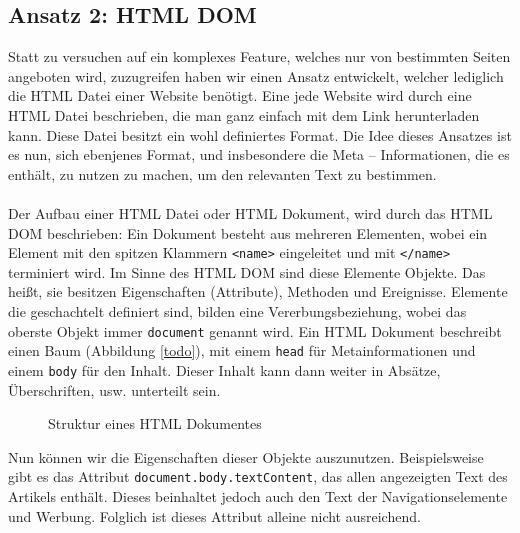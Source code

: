 \subsection[HTML DOM]{Ansatz 2: HTML DOM} %
\label{extractor:ansatz:subsec2}
Statt zu versuchen auf ein komplexes Feature, welches nur von bestimmten Seiten angeboten wird, zuzugreifen haben wir einen Ansatz entwickelt, welcher lediglich die HTML Datei einer Website benötigt. Eine jede Website wird durch eine HTML Datei beschrieben, die man ganz einfach mit dem Link herunterladen kann.
Diese Datei besitzt ein wohl definiertes Format. Die Idee dieses Ansatzes ist es nun, sich ebenjenes Format, und insbesondere die Meta – Informationen, die es enthält, zu nutzen zu machen, um den relevanten Text zu bestimmen. \\ \\ 
Der Aufbau einer HTML Datei oder HTML Dokument, wird durch das \ac{HTML DOM} beschrieben: Ein Dokument besteht aus mehreren Elementen, wobei ein Element mit den spitzen Klammern \texttt{<name>} eingeleitet und mit \texttt{</name>} terminiert wird. Im Sinne des \ac{HTML DOM} sind diese Elemente Objekte. Das heißt, sie besitzen Eigenschaften (Attribute), Methoden und Ereignisse. \cite{w3c_html} Elemente die geschachtelt definiert sind, bilden eine Vererbungsbeziehung, wobei das oberste Objekt immer \verb|document| genannt wird. Ein HTML Dokument beschreibt einen Baum (Abbildung \ref{todo}), mit einem \verb|head| für Metainformationen und einem \verb|body| für den Inhalt. Dieser Inhalt kann dann weiter in Absätze, Überschriften, usw. unterteilt sein.  \begin{figure}[h]
	
	\caption{Struktur eines HTML Dokumentes}
	\label{extractor:image:html}
\end{figure}

Nun können wir die Eigenschaften dieser Objekte auszunutzen. Beispielsweise gibt es das Attribut \texttt{document.body.textContent}, das allen angezeigten Text des Artikels enthält. Dieses beinhaltet jedoch auch den Text der Navigationselemente und Werbung. Folglich ist dieses Attribut alleine nicht ausreichend.

